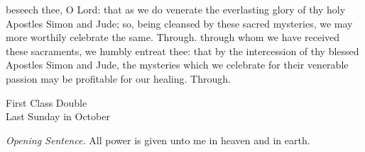 \secret
{} beseech thee, O Lord: that as we do venerate the everlasting glory of thy holy Apostles Simon and Jude; so, being cleansed by these sacred mysteries, we may more worthily celebrate the same. Through.
\postcommunion
{} through whom we have received these sacraments, we humbly entreat thee: that by the intercession of thy blessed Apostles Simon and Jude, the mysteries which we celebrate for their venerable passion may be profitable for our healing. Through.

\begin{inhead}
    {First Class Double\\
Last Sunday in October}
\end{inhead}
\fancyhead[RE,LO]{}
\par\noindent
\textit{Opening Sentence.} All power is given unto me in heaven and in earth.%



